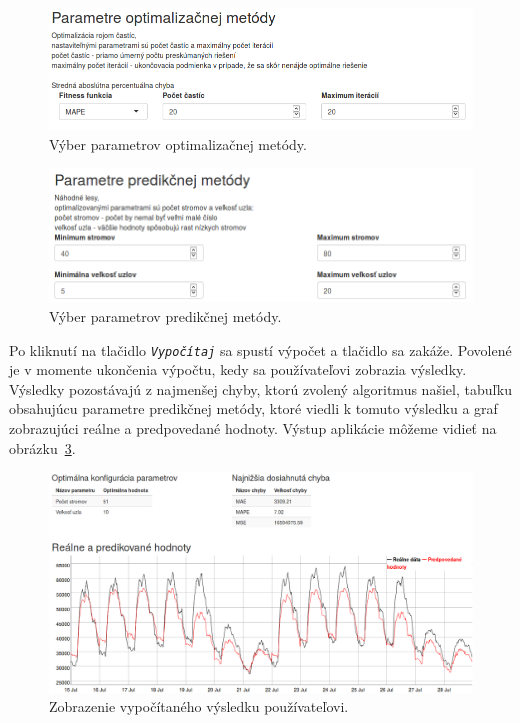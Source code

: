 \documentclass[a4paper,slovak,12pt,appendix]{article}
\begin{document}
\begin{appendices}
\begin{figure}[H]
  \centering
  \includegraphics[width=\textwidth]{app_optimization.png}
  \caption{Výber parametrov optimalizačnej metódy.}
  \label{fig-app-optimization}
\end{figure}

\begin{figure}[H]
  \centering
  \includegraphics[width=\textwidth]{app_prediction.png}
  \caption{Výber parametrov predikčnej metódy.}
  \label{fig-app-prediction}
\end{figure}

Po kliknutí na tlačidlo \texttt{\textit{Vypočítaj}} sa spustí výpočet a tlačidlo sa zakáže.
Povolené je v momente ukončenia výpočtu, kedy sa používateľovi zobrazia
výsledky. Výsledky pozostávajú z najmenšej chyby, ktorú zvolený algoritmus našiel,
tabuľku obsahujúcu parametre predikčnej metódy, ktoré viedli k tomuto výsledku
a graf zobrazujúci reálne a predpovedané hodnoty. Výstup aplikácie môžeme
vidieť na obrázku~\ref{fig-app-result}.

\begin{figure}[H]
  \centering
  \includegraphics[width=\textwidth]{app_result.png}
  \caption{Zobrazenie vypočítaného výsledku používateľovi.}
  \label{fig-app-result}
\end{figure}


\end{appendices}
\end{document}
